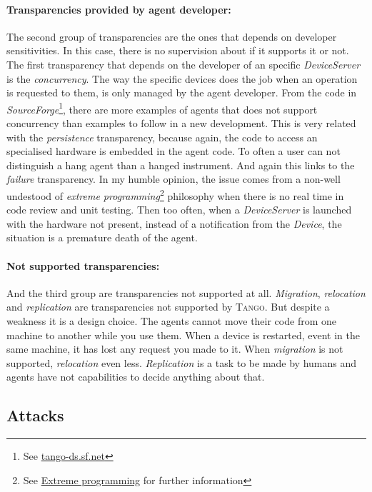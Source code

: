 \documentclass[10pt,a4paper,twoside]{llncs}
\newcommand{\tango}{\textsc{Tango}}
\begin{document}
\paragraph{Transparencies provided by agent developer:} The second group of transparencies are the ones that depends on developer sensitivities. In this case, there is no supervision about if it supports it or not. The first transparency that depends on the developer of an specific \emph{DeviceServer} is the \emph{concurrency}. The way the specific devices does the job when an operation is requested to them, is only managed by the agent developer. From the code in \emph{SourceForge}\footnote{See \href{http://tango-ds.sourceforge.net/}{tango-ds.sf.net}}, there are more examples of agents that does not support concurrency than examples to follow in a new development. This is very related with the \emph{persistence} transparency, because again, the code to access an specialised hardware is embedded in the agent code. To often a user can not distinguish a hang agent than a hanged instrument. And again this links to the \emph{failure} transparency. In my humble opinion, the issue comes from a non-well undestood 
of \emph{extreme programming}\footnote{See \href{http://en.wikipedia.org/wiki/Extreme_programming}{Extreme programming} for further information} philosophy when there is no real time in code review and unit testing. Then too often, when a \emph{DeviceServer} is launched with the hardware not present, instead of a notification from the \emph{Device}, the situation is a premature death of the agent.

\paragraph{Not supported transparencies:} And the third group are transparencies not supported at all. \emph{Migration}, \emph{relocation} and \emph{replication} are transparencies not supported by \tango. But despite a weakness it is a design choice. The agents cannot move their code from one machine to another while you use them. When a device is restarted, event in the same machine, it has lost any request you made to it. When \emph{migration} is not supported, \emph{relocation} even less. \emph{Replication} is a task to be made by humans and agents have not capabilities to decide anything about that.

\subsection{Attacks}
\end{document}

